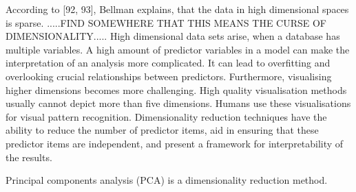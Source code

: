 
According to \textcite{DataMiningAndPredictiveAnalytics}[92, 93], Bellman \textcite{bellman2015adaptive} explains, that the data in high dimensional spaces is sparse.
.....FIND SOMEWHERE THAT THIS MEANS THE CURSE OF DIMENSIONALITY.....
High dimensional data sets arise, when a database has multiple  variables. A high amount of predictor variables in a model can make the interpretation of an analysis more complicated. It can lead to overfitting and overlooking crucial relationships between predictors. Furthermore, visualising higher dimensions becomes more challenging. High quality visualisation methods usually cannot depict more than five dimensions. Humans use these visualisations for visual pattern recognition. Dimensionality reduction techniques have the ability to reduce the number of predictor items, aid in ensuring that these predictor items are independent, and present a framework for interpretability of the results.

Principal components analysis (PCA) is a dimensionality reduction method. 



